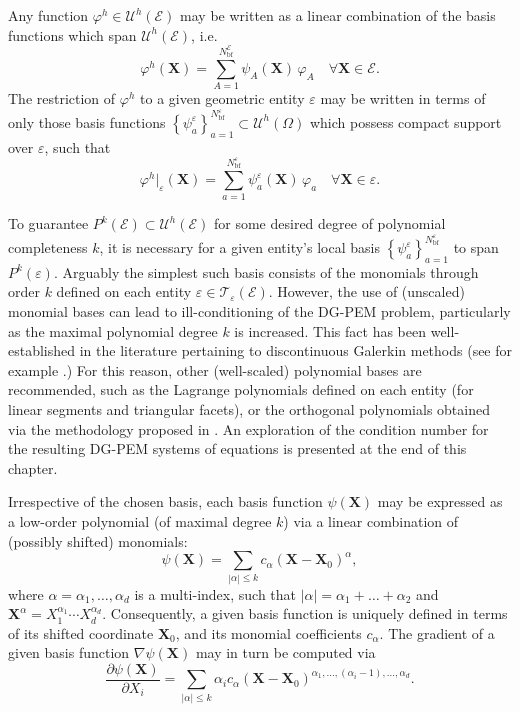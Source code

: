 		Any function $\varphi^h \in \mathcal{U}^h (\mathcal{E})$ may be written as a linear combination of the basis functions which span $\mathcal{U}^h (\mathcal{E})$, i.e.
		\begin{equation}
			\varphi^h (\bm{X}) = \sum_{A=1}^{N^{\mathcal{E}}_{\mathrm b\mathrm f}} \psi_A (\bm{X}) \, \varphi_A \quad \forall \bm{X} \in \mathcal{E}.
		\end{equation}
		The restriction of $\varphi^h$ to a given geometric entity $\varepsilon$ may be written in terms of only those basis functions $\left\{ \psi^\varepsilon_{a} \right\}_{a=1}^{N^\varepsilon_{\mathrm b\mathrm f}} \subset \mathcal{U}^h (\Omega)$ which possess compact support over $\varepsilon$, such that
		\begin{equation}
			\varphi^h|_\varepsilon (\bm{X}) = \sum_{a=1}^{N^\varepsilon_{\mathrm b\mathrm f}} \psi^\varepsilon_{a} (\bm{X}) \, \varphi_{a} \quad \forall \bm{X} \in \varepsilon.
		\end{equation}
		
		To guarantee $P^k (\mathcal{E}) \subset \mathcal{U}^h (\mathcal{E})$ for some desired degree of polynomial completeness $k$, it is necessary for a given entity's local basis $\left\{ \psi^\varepsilon_{a} \right\}_{a=1}^{N^\varepsilon_{\mathrm b\mathrm f}}$ to span $P^k (\varepsilon)$. Arguably the simplest such basis consists of the monomials through order $k$ defined on each entity $\varepsilon \in \mathcal{T}_\varepsilon (\mathcal{E})$. However, the use of (unscaled) monomial bases can lead to ill-conditioning of the DG-PEM problem, particularly as the maximal polynomial degree $k$ is increased. This fact has been well-established in the literature pertaining to discontinuous Galerkin methods (see for example \cite{Hesthaven:10}.) For this reason, other (well-scaled) polynomial bases are recommended, such as the Lagrange polynomials defined on each entity (for linear segments and triangular facets), or the orthogonal polynomials obtained via the methodology proposed in \cite{Bassi:12}. An exploration of the condition number for the resulting DG-PEM systems of equations is presented at the end of this chapter.
		
		Irrespective of the chosen basis, each basis function $\psi (\bm{X})$ may be expressed as a low-order polynomial (of maximal degree $k$) via a linear combination of (possibly shifted) monomials:
		\begin{equation}
			\psi (\bm{X}) = \sum_{|\alpha| \leq k} c_\alpha (\bm{X}-\bm{X}_0)^{\alpha},
		\end{equation}
		where $\alpha = \alpha_1, \ldots, \alpha_d$ is a multi-index, such that $|\alpha| = \alpha_1 + \ldots + \alpha_2$ and $\bm{X}^\alpha = X_1^{\alpha_1} \cdots X_d^{\alpha_d}$. Consequently, a given basis function is uniquely defined in terms of its shifted coordinate $\bm{X}_0$, and its monomial coefficients $c_\alpha$. The gradient of a given basis function $\nabla \psi (\bm{X})$ may in turn be computed via
		\begin{equation}
			\frac{\partial \psi (\bm{X})}{\partial X_i} = \sum_{|\alpha| \leq k} \alpha_i c_\alpha (\bm{X}-\bm{X}_0)^{\alpha_1, \ldots, (\alpha_i - 1), \ldots, \alpha_d}.
		\end{equation}
		
